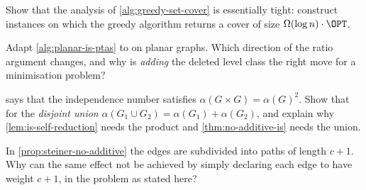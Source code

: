 \begin{exercise}
Show that the analysis of \cref{alg:greedy-set-cover} is essentially tight:
construct instances on which the greedy algorithm returns a cover of size
$\Omega(\log n) \cdot \OPT$.
\end{exercise}

\begin{exercise}
Adapt \cref{alg:planar-is-ptas} to  on planar graphs. Which
direction of the ratio argument changes, and why is \emph{adding} the deleted
level class the right move for a minimisation problem?
\end{exercise}

\begin{exercise}
 says that the independence number satisfies
$\alpha(G \times G) = \alpha(G)^2$. Show that for the \emph{disjoint union}
$\alpha(G_1 \cup G_2) = \alpha(G_1) + \alpha(G_2)$, and explain why
\cref{lem:is-self-reduction} needs the product and \cref{thm:no-additive-is}
needs the union.
\end{exercise}

\begin{exercise}
In \cref{prop:steiner-no-additive} the edges are subdivided into paths of length
$c+1$. Why can the same effect not be achieved by simply declaring each edge to
have weight $c+1$, in the problem as stated here?
\end{exercise}
